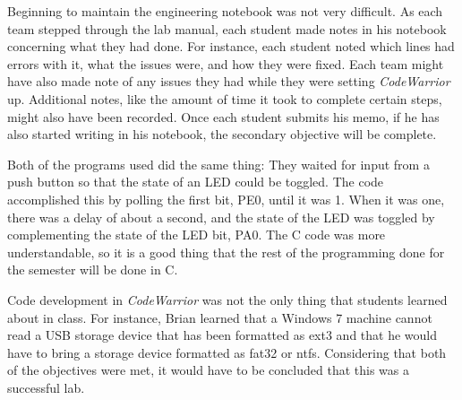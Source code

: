 \documentclass{letter}
\begin{document}
Beginning to maintain the engineering notebook was not very difficult. As each
team stepped through the lab manual, each student made notes in his notebook
concerning what they had done. For instance, each student noted which 
lines had errors with it, what the issues were, and how they were fixed. 
Each team might have also made note of any issues they had while they were
setting \emph{CodeWarrior} up. Additional notes, like the amount of time it
took to complete certain steps, might also have been recorded. Once
each student submits his memo, if he has also started writing in his 
notebook, the secondary objective will be complete.  

Both of the programs used did the same thing: They waited for input from a 
push button so that the state of an LED could be toggled. The code accomplished
this by polling the first bit, PE0, until it was 1. When it was one, there was a
delay of about a second, and the state of the LED was toggled by complementing 
the state of the LED bit, PA0. The C code was more understandable, so it is a 
good thing that the rest of the programming done for the semester will
be done in C. 

Code development in \emph{CodeWarrior} was not the only thing that students 
learned about in class. For instance, Brian learned that a Windows 7 machine
cannot read a USB storage device that has been formatted as ext3 and that
he would have to bring a storage device formatted as fat32 or ntfs.
Considering that both of the objectives were met, it would have to be concluded
that this was a successful lab. 
\label{end}
\end{document}
